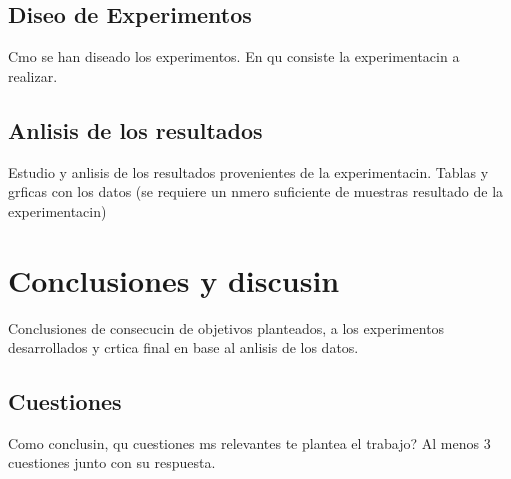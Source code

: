 \documentclass[11pt,twoside,a4paper]{book}
\renewcommand{\baselinestretch}{1.2}
\begin{document}
\section{Diseo de Experimentos}
Cmo se han diseado los experimentos. En qu consiste la experimentacin a realizar.

\section{Anlisis de los resultados}
Estudio y anlisis de los resultados provenientes de la experimentacin. Tablas y grficas con los datos (se requiere un nmero suficiente de muestras resultado de la experimentacin)

\chapter{Conclusiones y discusin}

Conclusiones de consecucin de objetivos planteados, a los experimentos
desarrollados y crtica final en base al anlisis de los datos.

\section{Cuestiones}
Como conclusin, qu cuestiones ms relevantes te plantea el trabajo? Al menos 3 cuestiones junto con su respuesta.


\appendix

\renewcommand{\baselinestretch}{1.2}



\cite{KM2000}
\end{document}
